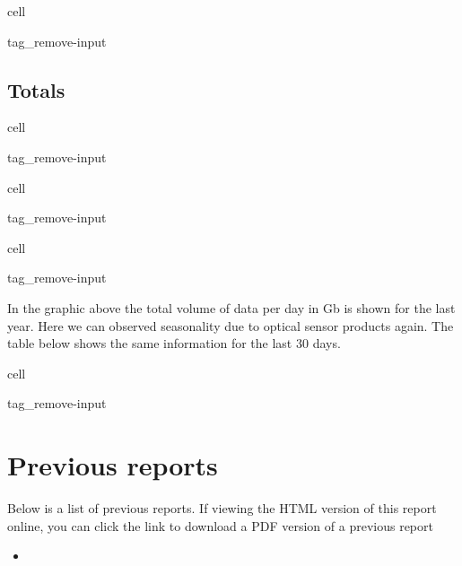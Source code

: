 \documentclass[letterpaper,10pt,english]{jupyterBook}
\begin{document}
\begin{sphinxuseclass}{cell}
\begin{sphinxuseclass}{tag_remove-input}
\end{sphinxuseclass}
\end{sphinxuseclass}

\section{Totals}
\label{\detokenize{volumes:totals}}
\begin{sphinxuseclass}{cell}
\begin{sphinxuseclass}{tag_remove-input}
\end{sphinxuseclass}
\end{sphinxuseclass}
\begin{sphinxuseclass}{cell}
\begin{sphinxuseclass}{tag_remove-input}
\end{sphinxuseclass}
\end{sphinxuseclass}
\begin{sphinxuseclass}{cell}
\begin{sphinxuseclass}{tag_remove-input}
\end{sphinxuseclass}
\end{sphinxuseclass}
\sphinxAtStartPar
In the graphic above the total volume of data per day in Gb is shown for the last year. Here we can observed seasonality due to optical sensor products again. The table below shows the same information for the last 30 days.

\begin{sphinxuseclass}{cell}
\begin{sphinxuseclass}{tag_remove-input}
\end{sphinxuseclass}
\end{sphinxuseclass}
\sphinxstepscope


\chapter{Previous reports}
\label{\detokenize{previous_reports:previous-reports}}\label{\detokenize{previous_reports::doc}}
\sphinxAtStartPar
Below is a list of previous reports. If viewing the HTML version of this report online, you can click the link to download a PDF version of a previous report
\begin{itemize}
\item {} 
\sphinxAtStartPar
{}

\end{itemize}







\renewcommand{\indexname}{Index}
\printindex
\end{document}
